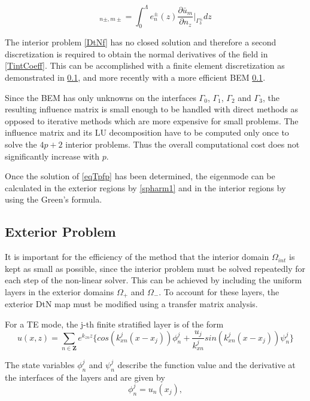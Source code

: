 \begin{equation}
[T_{int,p}(\gamma)]_{n \pm,m \pm} = \int_0^\Lambda e_n^\pm(z)
\frac{\partial \bar{u}_m}{\partial n_z} \bigg|_{\Gamma_3^\pm} dz
\label{TintCoeff}
\end{equation}

The interior problem \ref{DtNf} has no closed solution and therefore a
second discretization is required to obtain the normal derivatives of
the field in \ref{TintCoeff}. This can be accomplished with a finite
element discretization as demonstrated in \ref{}, and more recently
with a more efficient BEM \ref{}.

Since the BEM has only unknowns on the interfaces $\Gamma_0$,
$\Gamma_1$, $\Gamma_2$ and $\Gamma_3$, the resulting influence matrix
is small enough to be handled with direct methods as opposed to
iterative methods which are more expensive for small problems. The
influence matrix and its LU decomposition have to be computed only
once to solve the $4p+2$ interior problems. Thus the overall
computational cost does not significantly increase with $p$.

Once the solution of \ref{eqTpfp} has been determined, the eigenmode can be
calculated in the exterior regions by \ref{spharm1} and in the interior
regions by using the Green's formula.

\subsection{Exterior Problem}
It is important for the efficiency of the method that the interior
domain $\Omega_{int}$ is kept as small as possible, since the interior
problem must be solved repeatedly for each step of the non-linear
solver. This can be achieved by including the uniform layers in the
exterior domains $\Omega_+$ and $\Omega_-$. To account for these
layers, the exterior DtN map must be modified using a transfer matrix
analysis.

For a TE mode, the j-th finite stratified layer is of the form
\begin{equation}
u(x,z) = \sum_{n \in \mathbf{Z}} e^{k_{zn} z} \{cos(k_{xn}^j(x-x_j))
\phi_n^j + \frac{u_j}{k_{xn}^j} sin(k_{xn}^j(x-x_j))\psi_n^j \}
\end{equation}

The state variables $\phi_n^j$ and $\psi_n^j$ describe the function
value and the derivative at the interfaces of the layers and are given
by
\begin{equation}
\phi_n^j = u_n(x_j),
\end{equation}

